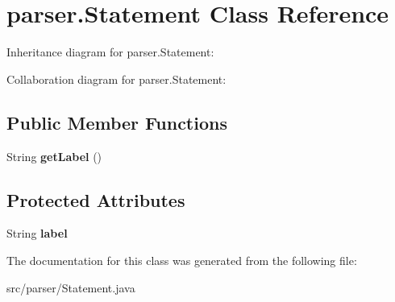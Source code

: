 \hypertarget{classparser_1_1_statement}{}\section{parser.\+Statement Class Reference}
\label{classparser_1_1_statement}


Inheritance diagram for parser.\+Statement\+:


Collaboration diagram for parser.\+Statement\+:
\subsection*{Public Member Functions}
\begin{DoxyCompactItemize}
\item 
String {\bfseries get\+Label} ()\hypertarget{classparser_1_1_statement_ae59b7a80533dcb37c47fa607eea2cbb3}{}\label{classparser_1_1_statement_ae59b7a80533dcb37c47fa607eea2cbb3}

\end{DoxyCompactItemize}
\subsection*{Protected Attributes}
\begin{DoxyCompactItemize}
\item 
String {\bfseries label}\hypertarget{classparser_1_1_statement_a1eb933030d96c30d1a6dd3dae5649863}{}\label{classparser_1_1_statement_a1eb933030d96c30d1a6dd3dae5649863}

\end{DoxyCompactItemize}


The documentation for this class was generated from the following file\+:\begin{DoxyCompactItemize}
\item 
src/parser/Statement.\+java\end{DoxyCompactItemize}
